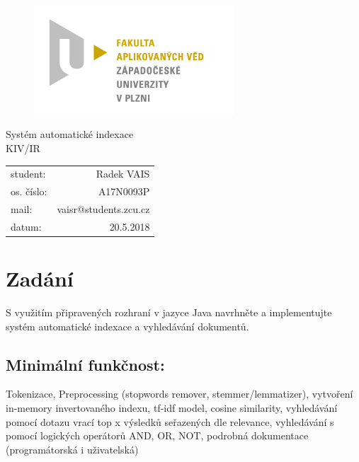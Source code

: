 \documentclass[12pt, a4paper]{article}
\begin{document}
\begin{figure}[h!]
\centering
\includegraphics[bb= 0 0 820 445 , width=75mm]{favlogo.jpg}
\end{figure}

{\centering
{\huge Systém automatické indexace}\\[1em]
{\large KIV/IR}\\[11,5cm]
}

\begin{tabular}{l r}
student: & Radek VAIS\\
os. číslo: & A17N0093P\\
mail: & vaisr@students.zcu.cz\\
datum: & 20.5.2018\\
\end{tabular}

\thispagestyle{empty}
\newpage

\section{Zadání} %

S využitím připravených rozhraní v jazyce Java navrhněte a implementujte systém automatické indexace a vyhledávání dokumentů.

\subsection{Minimální funkčnost:}

Tokenizace, Preprocessing (stopwords remover, stemmer/lemmatizer), vytvoření in-memory invertovaného indexu, tf-idf model, cosine similarity,  vyhledávání pomocí dotazu vrací top x výsledků seřazených dle relevance, vyhledávání s pomocí logických operátorů AND, OR, NOT, podrobná dokumentace (programátorská i uživatelská)
\end{document}

